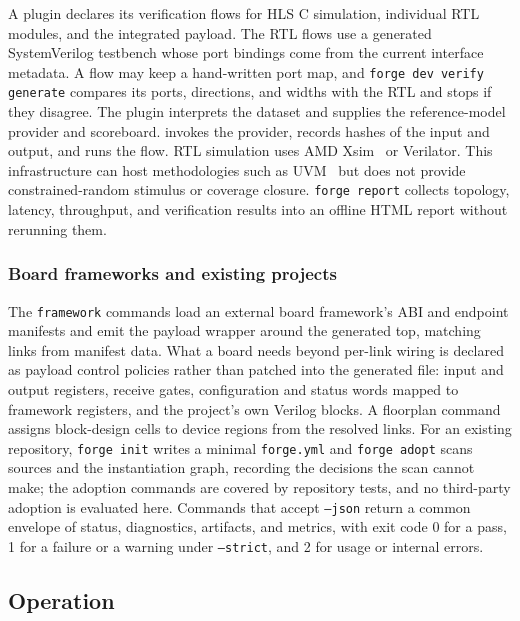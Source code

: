 A plugin declares its verification flows for HLS C simulation, individual RTL modules, and the integrated payload. The RTL flows use a generated SystemVerilog testbench whose port bindings come from the current interface metadata. A flow may keep a hand-written port map, and \texttt{forge dev verify generate} compares its ports, directions, and widths with the RTL and stops if they disagree. The plugin interprets the dataset and supplies the reference-model provider and scoreboard. \forge{} invokes the provider, records hashes of the input and output, and runs the flow. RTL simulation uses AMD Xsim~\cite{AMD_Vivado_LogicSimulation_UG900} or Verilator. This infrastructure can host methodologies such as UVM~\cite{Accellera_UVM} but does not provide constrained-random stimulus or coverage closure. \texttt{forge report} collects topology, latency, throughput, and verification results into an offline HTML report without rerunning them.

\subsubsection{Board frameworks and existing projects}
\label{sec:forge:external-integration}
\label{sec:forge:core-isolation}

The \texttt{framework} commands load an external board framework's ABI and endpoint manifests and emit the payload wrapper around the generated top, matching links from manifest data. What a board needs beyond per-link wiring is declared as payload control policies rather than patched into the generated file: input and output registers, receive gates, configuration and status words mapped to framework registers, and the project's own Verilog blocks. A floorplan command assigns block-design cells to device regions from the resolved links. For an existing repository, \texttt{forge init} writes a minimal \texttt{forge.yml} and \texttt{forge adopt} scans sources and the instantiation graph, recording the decisions the scan cannot make; the adoption commands are covered by repository tests, and no third-party adoption is evaluated here. Commands that accept \texttt{--json} return a common envelope of status, diagnostics, artifacts, and metrics, with exit code 0 for a pass, 1 for a failure or a warning under \texttt{--strict}, and 2 for usage or internal errors.

\subsection{Operation}
\label{sec:methods:operation}

